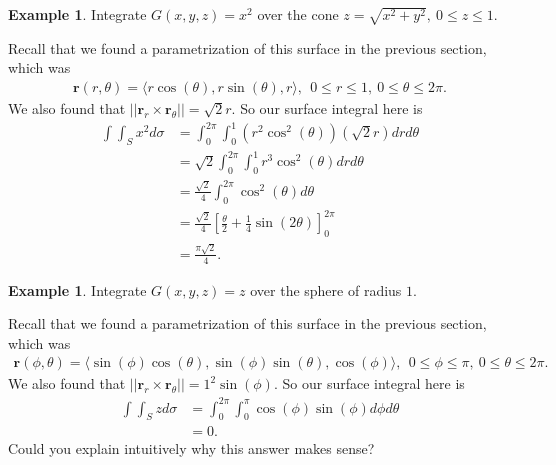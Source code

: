 \documentclass[12pt, letter]{article}
\theoremstyle{plain}
\numberwithin{theorem}{section}
\theoremstyle{definition}
\newtheorem{example}[theorem]{Example}
\begin{document}
\begin{example}
Integrate $G(x,y,z) = x^2$ over the cone $z=\sqrt{x^2+y^2}, \ 0\leq z \leq 1$.

\bigskip

Recall that we found a parametrization of this surface in the previous section, which was
\begin{align*}
\bm{r}(r,\theta) = \langle r\cos(\theta),r\sin(\theta),r\rangle, \ \ 0\leq r\leq 1, \ 0\leq \theta \leq 2\pi.
\end{align*}
We also found that $||\bm{r}_r\times \bm{r}_\theta|| = \sqrt{2}r$. So our surface integral here is
\begin{align*}
\int\int_S x^2d\sigma &= \int_0^{2\pi}\int_0^1 (r^2\cos^2(\theta))(\sqrt{2}r)drd\theta\\
&= \sqrt{2}\int_0^{2\pi}\int_0^1 r^3\cos^2(\theta)drd\theta\\
&= \frac{\sqrt{2}}{4} \int_0^{2\pi} \cos^2(\theta)d\theta\\
&= \frac{\sqrt{2}}{4}\left[\frac{\theta}{2}+\frac{1}{4}\sin(2\theta)\right]_0^{2\pi}\\
&= \frac{\pi\sqrt{2}}{4}.
\end{align*}
\end{example}

\bigskip

\hrulefill

\bigskip

\begin{example}
Integrate $G(x,y,z) = z$ over the sphere of radius $1$.

\bigskip

Recall that we found a parametrization of this surface in the previous section, which was
\begin{align*}
\bm{r}(\phi,\theta) = \langle \sin(\phi)\cos(\theta),\sin(\phi)\sin(\theta),\cos(\phi)\rangle, \ \ 0\leq \phi\leq \pi, \ 0\leq \theta \leq 2\pi.
\end{align*}
We also found that $||\bm{r}_r\times \bm{r}_\theta|| = 1^2\sin(\phi)$. So our surface integral here is
\begin{align*}
\int\int_S z d\sigma &= \int_0^{2\pi}\int_0^\pi \cos(\phi)\sin(\phi)d\phi d\theta\\
&= 0.
\end{align*}
Could you explain intuitively why this answer makes sense?
\end{example}

\bigskip

\hrulefill
\end{document}
